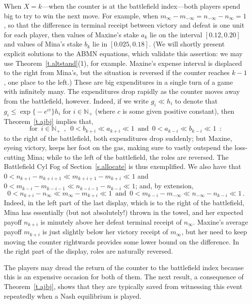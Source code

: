 \documentclass[letterpaper,11pt,oneside,reqno]{amsbook}
\newcommand{\N}{\ensuremath{\mathbb{N}}}
\numberwithin{figure}{chapter}
\theoremstyle{definition}
\theoremstyle{definition}
\theoremstyle{definition}
\theoremstyle{definition}
\theoremstyle{definition}
\newcommand{\nwithoutzero}{\N_+}
\newcommand{\abmnmacspace}{\textrm{ABMN} }
\begin{document}
 When $X = k$---when the counter is at the battlefield index---both players spend big to try to win the next move. For example, when $m_\infty - m_{-\infty} = n_{-\infty} - n_\infty =1$,
 so that the difference in terminal receipt between victory and defeat is one unit for each player, then values of Maxine's stake $a_k$
 lie on the interval $[0.12,0.20]$ and values of Mina's stake $b_k$ lie in  $[0.025,0.18]$. (We will shortly present explicit solutions to the \abmnmacspace equations, which validate this assertion: we may use Theorem~\ref{t.altstand}(1), for example. Maxine's expense interval is displaced to the right from Mina's, but the situation is reversed if the counter reaches $k-1$, one place to the left.) 
 These are big expenditures in a single turn of a game with infinitely many. The expenditures drop rapidly as the counter moves away from the battlefield, however. Indeed, if we write  $g_i \ll h_i$ to denote that $g_i \leq \exp \big\{ - e^{ci}  \big\} h_i$ for $i \in \nwithoutzero$ (where $c$ is some given positive constant), then Theorem~\ref{t.ajbj} implies that,
  $$
 \textrm{for} \, \, \,  i \in \nwithoutzero \, \, \, , \, \, \,  
 0 < b_{k+i} \ll a_{k+i} \ll 1 \, \, \, \textrm{and} \, \, \, 0 < a_{k-i} \ll b_{k - i} \ll 1 \, \, \, :
 $$
 to the right of the battlefield, both expenditures drop suddenly; but Maxine, eyeing victory, keeps her foot on the gas, making sure to vastly outspend the loss-cutting Mina; while to the left of the battlefield, the roles are reversed. The Battlefield Cyl Fog of Section~\ref{s.allocate} is thus exemplified.
  We also have that
 $0 < n_{k+i} - n_{k+i+1} \ll m_{k+i+1} - m_{k+i} \ll 1$ and $0 < m_{k-i} - m_{k-i-1} \ll n_{k-i-1} - n_{k-i} \ll 1$; and, by extension, 
 $$
 0 < n_{k+i} - n_\infty \ll m_\infty - m_{k+i}  \ll 1 \, \, \, \textrm{and} \, \, \,   0 < m_{k-i} - m_{-\infty} \ll n_{-\infty} - n_{k-i}  \ll 1 \, .
 $$ 
 Indeed, in the left part of the last display, which is to the right of the battlefield, Mina has essentially (but not absolutely!) thrown in the towel, and her expected payoff $n_{k+i}$ is minutely above her defeat terminal receipt of $n_\infty$. Maxine's average payoff $m_{k+i}$ is just slightly below her victory receipt of $m_\infty$, but her need to keep moving the counter rightwards provides some lower bound on the difference.
 In the right part of the display, roles are naturally reversed.
 
 The players may dread the return of the counter to the battlefield index because this is an expensive occasion for both of them. The next result, a consequence of Theorem~\ref{t.ajbj}, shows that they are typically saved from witnessing this event repeatedly when a Nash equilibrium is played.
 
\end{document}
